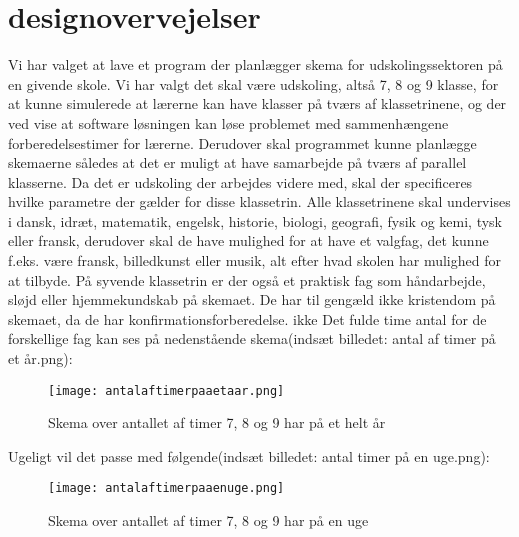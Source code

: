 \documentclass{article}
\begin{document}
\section{designovervejelser}
Vi har valget at lave et program der planlægger skema for udskolingssektoren på en givende skole. Vi har valgt det skal være udskoling, altså 7, 8 og 9 klasse, for at kunne simulerede at lærerne kan have klasser på tværs af klassetrinene, og der ved vise at software løsningen kan løse problemet med sammenhængene forberedelsestimer for lærerne. Derudover skal programmet kunne planlægge skemaerne således at det er muligt at have samarbejde på tværs af parallel klasserne.  Da det er udskoling der arbejdes videre med, skal der specificeres hvilke parametre der gælder for disse klassetrin. Alle klassetrinene skal undervises i dansk, idræt, matematik, engelsk, historie, biologi, geografi, fysik og kemi, tysk eller fransk, derudover skal de have mulighed for at have et valgfag, det kunne f.eks. være fransk, billedkunst eller musik, alt efter hvad skolen har mulighed for at tilbyde. På syvende klassetrin er der også et praktisk fag som håndarbejde, sløjd eller hjemmekundskab på skemaet. De har til gengæld ikke kristendom på skemaet, da de har konfirmationsforberedelse. ikke Det fulde time antal for de forskellige fag kan ses på nedenstående skema(indsæt billedet: antal af timer på et år.png):
\begin{figure}[h!]
\texttt{[image: antalaftimerpaaetaar.png]}
\caption{Skema over antallet af timer 7, 8 og 9 har på et helt år}
\label{Fig: XXX}
\end{figure}

Ugeligt vil det passe med følgende(indsæt billedet: antal timer på en uge.png):
\begin{figure}[h!]
\texttt{[image: antalaftimerpaaenuge.png]}
\caption{Skema over antallet af timer 7, 8 og 9 har på en uge}
\label{Fig: XXX2}
\end{figure}
\end{document}
